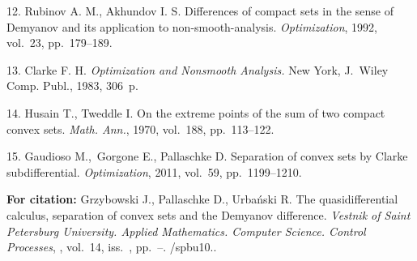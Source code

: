 {12.  {Rubinov  A. M., Akhundov I. S.}
 Differences of compact sets in the sense of Demyanov and its application
to non-smooth-analysis. {\it Optimization}, 1992, vol.~23,
pp.~179--189.

13.    Clarke F. H. {\it Optimization and Nonsmooth Analysis.} New
York, J.~Wiley Comp. Publ.,  1983, 306~p.

14.   {Husain T., Tweddle I.}
 On the extreme points of the sum of two compact convex sets.
{\it  Math. Ann.}, 1970, vol.~188, pp.~113--122.

15. {Gaudioso M.,~Gorgone E., Pallaschke D.} Separation of convex
sets by Clarke subdifferential. {\it Optimization}, 2011, vol.~59,
pp.~1199--1210.







\vskip 2mm

{\bf For citation:}   Grzybowski J., Pallaschke D., Urba\'{n}ski
R. The quasidifferential calculus, separation of convex sets and
the Demyanov difference. {\it Vestnik of Saint Petersburg
University. Applied Mathematics. Computer Science. Control
Processes}, \issueyear, vol.~14, iss.~\issuenum,
pp.~\pageref{p3}--\pageref{p3e}.
\doivyp/spbu10.\issueyear.



}
